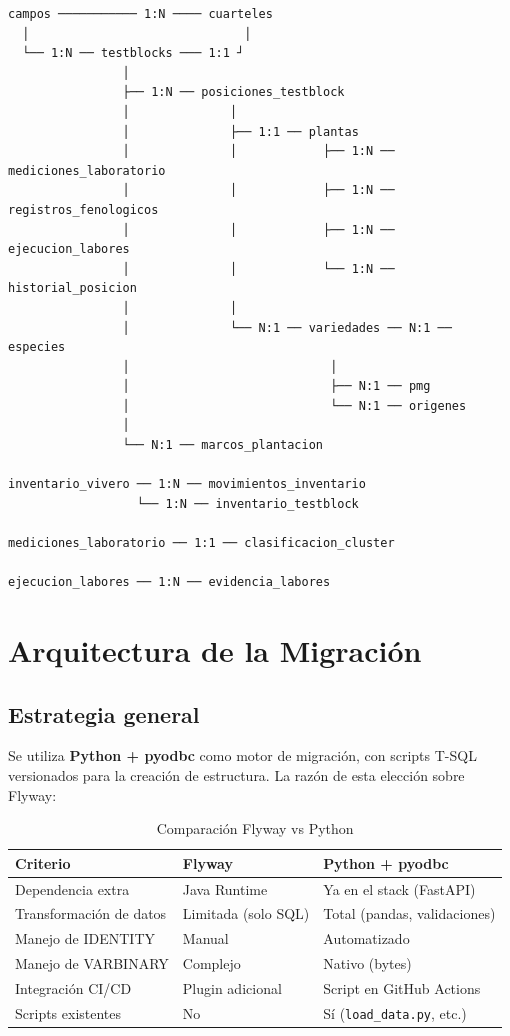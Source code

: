 \documentclass[12pt,a4paper,twoside]{report}
\begin{document}
\begin{verbatim}
campos ─────────── 1:N ──── cuarteles
  │                              │
  └── 1:N ── testblocks ─── 1:1 ┘
                │
                ├── 1:N ── posiciones_testblock
                │              │
                │              ├── 1:1 ── plantas
                │              │            ├── 1:N ── mediciones_laboratorio
                │              │            ├── 1:N ── registros_fenologicos
                │              │            ├── 1:N ── ejecucion_labores
                │              │            └── 1:N ── historial_posicion
                │              │
                │              └── N:1 ── variedades ── N:1 ── especies
                │                            │
                │                            ├── N:1 ── pmg
                │                            └── N:1 ── origenes
                │
                └── N:1 ── marcos_plantacion

inventario_vivero ── 1:N ── movimientos_inventario
                  └── 1:N ── inventario_testblock

mediciones_laboratorio ── 1:1 ── clasificacion_cluster

ejecucion_labores ── 1:N ── evidencia_labores
\end{verbatim}

\chapter{Arquitectura de la Migraci\'on}

\section{Estrategia general}

Se utiliza \textbf{Python + pyodbc} como motor de migraci\'on, con scripts T-SQL versionados para la creaci\'on de estructura. La raz\'on de esta elecci\'on sobre Flyway:

\begin{table}[H]
\centering
\caption{Comparaci\'on Flyway vs Python}
\begin{tabularx}{\textwidth}{lXX}
\toprule
\textbf{Criterio} & \textbf{Flyway} & \textbf{Python + pyodbc} \\
\midrule
Dependencia extra & Java Runtime & Ya en el stack (FastAPI) \\
Transformaci\'on de datos & Limitada (solo SQL) & Total (pandas, validaciones) \\
Manejo de IDENTITY & Manual & Automatizado \\
Manejo de VARBINARY & Complejo & Nativo (bytes) \\
Integraci\'on CI/CD & Plugin adicional & Script en GitHub Actions \\
Scripts existentes & No & S\'i (\texttt{load\_data.py}, etc.) \\
\bottomrule
\end{tabularx}
\end{table}
\end{document}
